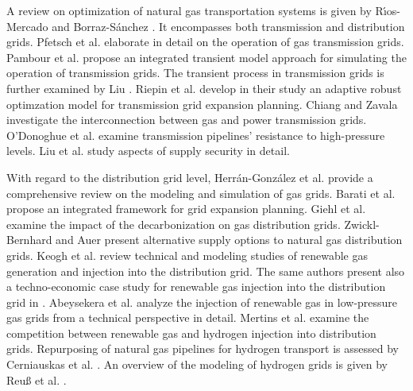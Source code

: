 A review on optimization of natural gas transportation systems is given by R{\'\i}os-Mercado and Borraz-S{\'a}nchez \cite{rios2015optimization}. It encompasses both transmission and distribution grids. Pfetsch et al. \cite{pfetsch2015validation} elaborate in detail on the operation of gas transmission grids. Pambour et al. \cite{pambour2016integrated} propose an integrated transient model approach for simulating the operation of transmission grids. The transient process in transmission grids is further examined by Liu \cite{liu2011coordinated}. Riepin et al. \cite{riepin2022adaptive} develop in their study an adaptive robust optimzation model for transmission grid expansion planning. Chiang and Zavala \cite{chiang2016large} investigate the interconnection between gas and power transmission grids. O'Donoghue et al. \cite{o1997development} examine transmission pipelines' resistance to high-pressure levels. Liu et al. \cite{liu2009security} study aspects of supply security in detail.\vspace{0.3cm}

With regard to the distribution grid level, Herr{\'a}n-Gonz{\'a}lez et al. \cite{herran2009modeling} provide a comprehensive review on the modeling and simulation of gas grids. Barati et al. \cite{barati2014multi} propose an integrated framework for grid expansion planning.  Giehl et al. \cite{giehl2023assessment} examine the impact of the decarbonization on gas distribution grids. Zwickl-Bernhard and Auer \cite{zwickl2022demystifying} present alternative supply options to natural gas distribution grids. Keogh et al. \cite{keogh2022gas} review technical and modeling studies of renewable gas generation and injection into the distribution grid. The same authors present also a techno-economic case study for renewable gas injection into the distribution grid in \cite{keogh2022gas}. Abeysekera et al. \cite{abeysekera2016steady} analyze the injection of renewable gas in low-pressure gas grids from a technical perspective in detail. Mertins et al. \cite{mertins2023competition} examine the competition between renewable gas and hydrogen injection into distribution grids. Repurposing of natural gas pipelines for hydrogen transport is assessed by Cerniauskas et al. \cite{cerniauskas2020options}. An overview of the modeling of hydrogen grids is given by Reuß et al. \cite{reuss2019modeling}.\vspace{0.3cm}

